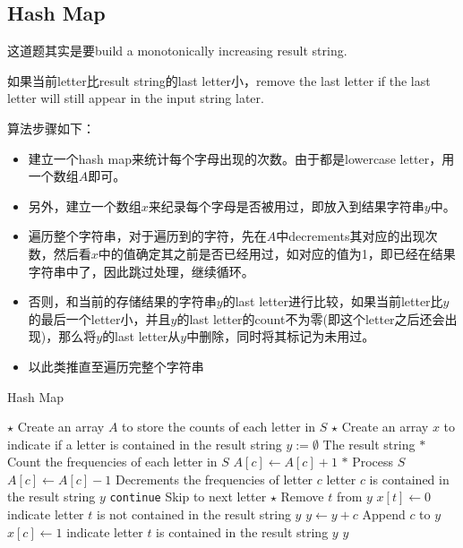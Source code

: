 \subsection{Hash Map}
这道题其实是要build a monotonically increasing result string.
\par
如果当前letter比result string的last letter小，remove the last letter if the last letter will still appear in the input string later.
\par
算法步骤如下：
\begin{itemize}
\item 建立一个hash map来统计每个字母出现的次数。由于都是lowercase letter，用一个数组$A$即可。
\item 另外，建立一个数组$ x $来纪录每个字母是否被用过，即放入到结果字符串$y$中。
\item 遍历整个字符串，对于遍历到的字符，先在$ A $中decrements其对应的出现次数，然后看$ x $中的值确定其之前是否已经用过，如对应的值为1，即已经在结果字符串中了，因此跳过处理，继续循环。
\item 否则，和当前的存储结果的字符串$y$的last letter进行比较，如果当前letter比$y$的最后一个letter小，并且$y$的last letter的count不为零(即这个letter之后还会出现)，那么将$y$的last letter从$ y $中删除，同时将其标记为未用过。
\item 以此类推直至遍历完整个字符串
\end{itemize}
\setcounter{algorithm}{0}
\begin{algorithm}[H]
\caption{Hash Map}
\begin{algorithmic}[1]
\State $\star$ Create an array $A$ to store the counts of each letter in $S$
\State $\star$ Create an array $ x $ to indicate if a letter is contained in the result string
\State $y:=\emptyset$ \Comment The result string
\State $\ast$ Count the frequencies of each letter in $S$
\State $A[c]\gets A[c] + 1$
\EndFor
\State $\ast$ Process $S$
\State $A[c]\gets A[c]-1$ \Comment Decrements the frequencies of letter $ c $
 \Comment letter $ c $ is contained in the result string $ y $
\State \texttt{continue} \Comment Skip to next letter
\EndIf
{}
\State $\star$ Remove $t$ from $y$
\State $x[t]\gets 0$ \Comment indicate letter $t$ is not contained in the result string $ y $
\EndWhile
\State $y\gets y+c$ \Comment Append $ c $ to $ y $
\State $x[c]\gets 1$ \Comment indicate letter $t$ is contained in the result string $ y $
\EndFor
\State \Return $ y $
\EndProcedure
\end{algorithmic}
\end{algorithm}
